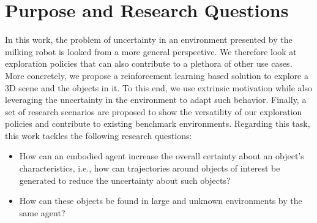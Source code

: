 \section{Purpose and Research Questions}\label{chap:1:research-question}
In this work, the problem of uncertainty in an environment presented by the milking robot is looked from a more general perspective. We therefore look at exploration policies that can also contribute to a plethora of other use cases. More concretely, we propose a reinforcement learning based solution to explore a 3D scene and the objects in it. To this end, we use extrinsic motivation while also leveraging the uncertainty in the environment to adapt such behavior.
Finally, a set of research scenarios are proposed to show the versatility of our exploration policies and contribute to existing benchmark environments. 
Regarding this task, this work tackles the following research questions:
\begin{itemize}
    \item How can an embodied agent increase the overall certainty about an object's characteristics, i.e., how can trajectories around objects of interest be generated to reduce the uncertainty about such objects? 
    \item How can these objects be found in large and unknown environments by the same agent?
    
\end{itemize}

